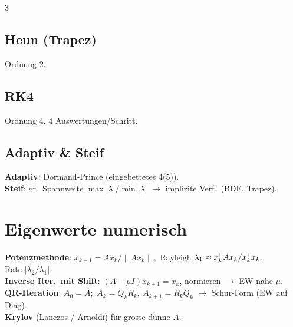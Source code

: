 \documentclass[8pt,a4paper]{extarticle}
\begin{document}
\begin{multicols*}{3}
\subsection{Heun (Trapez)}
Ordnung 2.

\subsection{RK4}
Ordnung 4, 4 Auswertungen/Schritt.

\subsection{Adaptiv \& Steif}
\textbf{Adaptiv}: Dormand-Prince (eingebettetes 4(5)).\\
\textbf{Steif}: gr.\ Spannweite $\max|\lambda|/\min|\lambda|$ $\to$ implizite Verf.\ (BDF, Trapez).

\section{Eigenwerte numerisch}
\textbf{Potenzmethode}: $x_{k+1}=Ax_k/\|Ax_k\|$,\ Rayleigh $\lambda_1\approx x_k^{\!\top} Ax_k/x_k^{\!\top} x_k$.\\
Rate $|\lambda_2/\lambda_1|$.\\[0.3ex]
\textbf{Inverse Iter.\ mit Shift}: $(A-\mu I)x_{k+1}=x_k$, normieren $\to$ EW nahe $\mu$.\\[0.3ex]
\textbf{QR-Iteration}: $A_0{=}A$;\ $A_k=Q_kR_k,\ A_{k+1}=R_kQ_k$ $\to$ Schur-Form (EW auf Diag).\\
\textbf{Krylov} (Lanczos / Arnoldi) f\"ur grosse d\"unne $A$.


\end{multicols*}
\end{document}

